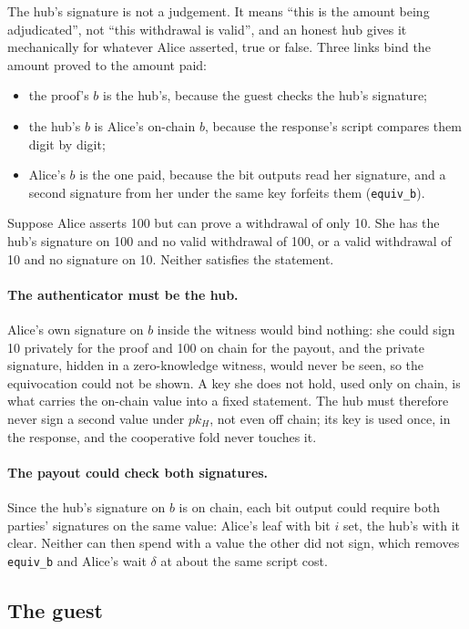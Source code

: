 \documentclass[11pt]{article}
\newcommand{\tx}[1]{\texttt{#1}}
\begin{document}
The hub's signature is not a judgement. It means ``this is the amount
being adjudicated'', not ``this withdrawal is valid'', and an honest hub
gives it mechanically for whatever Alice asserted, true or false. Three
links bind the amount proved to the amount paid:
\begin{itemize}[leftmargin=1.5em]
\item the proof's $b$ is the hub's, because the guest checks the hub's
  signature;
\item the hub's $b$ is Alice's on-chain $b$, because the response's
  script compares them digit by digit;
\item Alice's $b$ is the one paid, because the bit outputs read her
  signature, and a second signature from her under the same key forfeits
  them (\tx{equiv\_b}).
\end{itemize}
Suppose Alice asserts 100 but can prove a withdrawal of only 10. She has
the hub's signature on 100 and no valid withdrawal of 100, or a valid
withdrawal of 10 and no signature on 10. Neither satisfies the
statement.

\paragraph{The authenticator must be the hub.} Alice's own signature on
$b$ inside the witness would bind nothing: she could sign 10 privately
for the proof and 100 on chain for the payout, and the private
signature, hidden in a zero-knowledge witness, would never be seen, so
the equivocation could not be shown. A key she does not hold, used only
on chain, is what carries the on-chain value into a fixed statement. The
hub must therefore never sign a second value under $pk_H$, not even off
chain; its key is used once, in the response, and the cooperative fold
never touches it.

\paragraph{The payout could check both signatures.} Since the hub's
signature on $b$ is on chain, each bit output could require both
parties' signatures on the same value: Alice's leaf with bit $i$ set, the
hub's with it clear. Neither can then spend with a value the other did
not sign, which removes \tx{equiv\_b} and Alice's wait $\delta$ at about
the same script cost.

\subsection{The guest}
\end{document}
